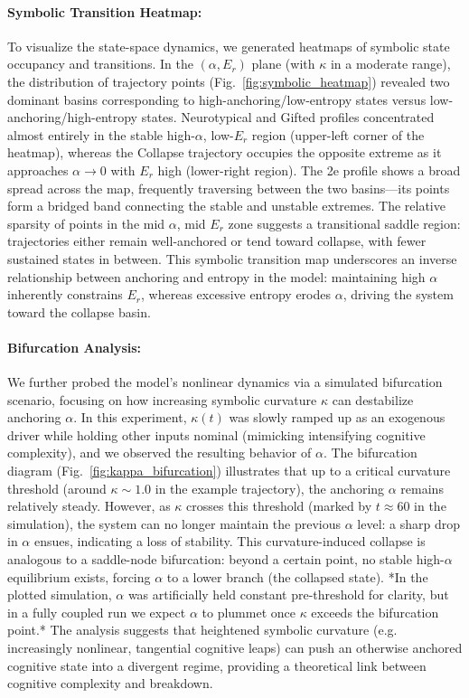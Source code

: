 \paragraph{Symbolic Transition Heatmap:} To visualize the state-space dynamics, we generated heatmaps of symbolic state occupancy and transitions. In the $(\alpha, E_r)$ plane (with $\kappa$ in a moderate range), the distribution of trajectory points (Fig.~\ref{fig:symbolic_heatmap}) revealed two dominant basins corresponding to high-anchoring/low-entropy states versus low-anchoring/high-entropy states. Neurotypical and Gifted profiles concentrated almost entirely in the stable high-$\alpha$, low-$E_r$ region (upper-left corner of the heatmap), whereas the Collapse trajectory occupies the opposite extreme as it approaches $\alpha\to0$ with $E_r$ high (lower-right region). The 2e profile shows a broad spread across the map, frequently traversing between the two basins—its points form a bridged band connecting the stable and unstable extremes. The relative sparsity of points in the mid $\alpha$, mid $E_r$ zone suggests a transitional saddle region: trajectories either remain well-anchored or tend toward collapse, with fewer sustained states in between. This symbolic transition map underscores an inverse relationship between anchoring and entropy in the model: maintaining high $\alpha$ inherently constrains $E_r$, whereas excessive entropy erodes $\alpha$, driving the system toward the collapse basin.

\paragraph{Bifurcation Analysis:} We further probed the model’s nonlinear dynamics via a simulated bifurcation scenario, focusing on how increasing symbolic curvature $\kappa$ can destabilize anchoring $\alpha$. In this experiment, $\kappa(t)$ was slowly ramped up as an exogenous driver while holding other inputs nominal (mimicking intensifying cognitive complexity), and we observed the resulting behavior of $\alpha$. The bifurcation diagram (Fig.~\ref{fig:kappa_bifurcation}) illustrates that up to a critical curvature threshold (around $\kappa \sim 1.0$ in the example trajectory), the anchoring $\alpha$ remains relatively steady. However, as $\kappa$ crosses this threshold (marked by $t \approx 60$ in the simulation), the system can no longer maintain the previous $\alpha$ level: a sharp drop in $\alpha$ ensues, indicating a loss of stability. This curvature-induced collapse is analogous to a saddle-node bifurcation: beyond a certain point, no stable high-$\alpha$ equilibrium exists, forcing $\alpha$ to a lower branch (the collapsed state). *In the plotted simulation, $\alpha$ was artificially held constant pre-threshold for clarity, but in a fully coupled run we expect $\alpha$ to plummet once $\kappa$ exceeds the bifurcation point.* The analysis suggests that heightened symbolic curvature (e.g. increasingly nonlinear, tangential cognitive leaps) can push an otherwise anchored cognitive state into a divergent regime, providing a theoretical link between cognitive complexity and breakdown.

